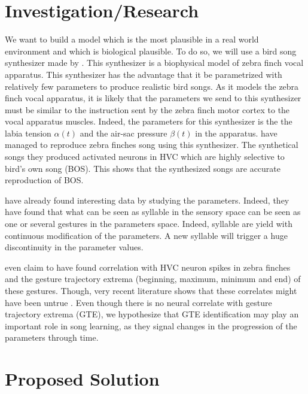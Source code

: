 \documentclass[a4paper, 11pt]{article}
\begin{document}
\section*{Investigation/Research}

We want to build a model which is the most plausible in a real world environment
and which is biological plausible. To do so, we will use a bird song synthesizer
made by \textcite{boari_automatic_2015}. This synthesizer is a biophysical model
of zebra finch vocal apparatus. This synthesizer has the advantage that it be
parametrized with relatively few parameters to produce realistic bird songs. As
it models the zebra finch vocal apparatus, it is likely that the parameters we
send to this synthesizer must be similar to the instruction sent by the zebra
finch motor cortex to the vocal apparatus muscles. Indeed, the parameters for
this synthesizer is the the labia tension \(\alpha(t)\) and the air-sac pressure
\(\beta(t)\) in the apparatus.
\textcite{amador_elemental_2013, boari_automatic_2015} have managed to reproduce
zebra finches song using this synthesizer. The synthetical songs they produced
activated neurons in HVC which are highly selective to bird's own song (BOS).
This shows that the synthesized songs are accurate reproduction of BOS.

\textcite{amador_low_2014, boari_automatic_2015} have already found interesting
data by studying the parameters. Indeed, they have found that what can be seen
as syllable in the sensory space can be seen as one or several gestures in the
parameters space. Indeed, syllable are yield with continuous modification of the
parameters. A new syllable will trigger a huge discontinuity in the parameter
values.

\textcite{amador_elemental_2013} even claim to have found correlation with HVC
neuron spikes in zebra finches and the gesture trajectory extrema (beginning,
maximum, minimum and end) of these gestures. Though, very recent literature
shows that these correlates might have been untrue
\parencite{lynch_rhythmic_2016, picardo_population-level_2016}. Even though
there is no neural correlate with gesture trajectory extrema (GTE), we
hypothesize that GTE identification may play an important role in song learning,
as they signal changes in the progression of the parameters through time.

\section*{Proposed Solution}
\end{document}
